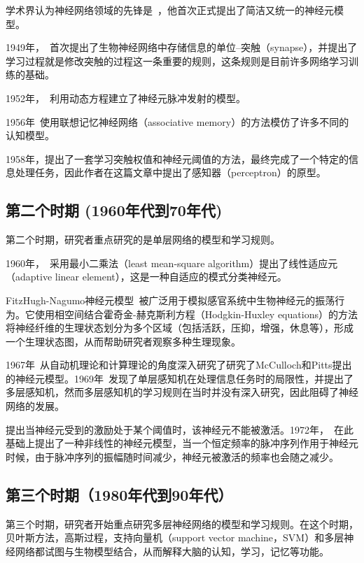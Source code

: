 学术界认为神经网络领域的先锋是~\citet{mcculloch1943logical}，他首次正式提出了简洁又统一的神经元模型。

1949年，~\citet{hebb1963organizations, gerstner2002mathematical}首次提出了生物神经网络中存储信息的单位--突触（synapse），并提出了学习过程就是修改突触的过程这一条重要的规则，这条规则是目前许多网络学习训练的基础。

1952年，~\citet{hodgkin1952quantitative}利用动态方程建立了神经元脉冲发射的模型。

1956年~\citet{taylor1956electrical}使用联想记忆神经网络（associative memory）的方法模仿了许多不同的认知模型。

1958年，\citet{rosenblatt1958perceptron}提出了一套学习突触权值和神经元阈值的方法，最终完成了一个特定的信息处理任务，因此作者在这篇文章中提出了感知器（perceptron）的原型。

\subsection{第二个时期 (1960年代到70年代)}
第二个时期，研究者重点研究的是单层网络的模型和学习规则。

1960年，~\citet{widrow1960adaptive}采用最小二乘法（least mean-square algorithm）提出了线性适应元（adaptive linear element），这是一种自适应的模式分类神经元。

FitzHugh-Nagumo神经元模型~\cite{fitzhugh1961impulses}被广泛用于模拟感官系统中生物神经元的振荡行为。它使用相空间结合霍奇金-赫克斯利方程（Hodgkin-Huxley equations）的方法将神经纤维的生理状态划分为多个区域（包括活跃，压抑，增强，休息等），形成一个生理状态图，从而帮助研究者观察多种生理现象。

1967年~\citet{minsky1967computation}从自动机理论和计算理论的角度深入研究了研究了McCulloch和Pitts提出的神经元模型。1969年~\citet{minsky5paper}发现了单层感知机在处理信息任务时的局限性，并提出了多层感知机，然而多层感知机的学习规则在当时并没有深入研究，因此阻碍了神经网络的发展。

\citet{cainiello1961outline}提出当神经元受到的激励处于某个阈值时，该神经元不能被激活。1972年，~\citet{nagumo1972response}在此基础上提出了一种非线性的神经元模型，当一个恒定频率的脉冲序列作用于神经元时候，由于脉冲序列的振幅随时间减少，神经元被激活的频率也会随之减少。

\subsection{第三个时期（1980年代到90年代）}
第三个时期，研究者开始重点研究多层神经网络的模型和学习规则。在这个时期，贝叶斯方法，高斯过程，支持向量机（support vector machine，SVM）和多层神经网络都试图与生物模型结合，从而解释大脑的认知，学习，记忆等功能。

